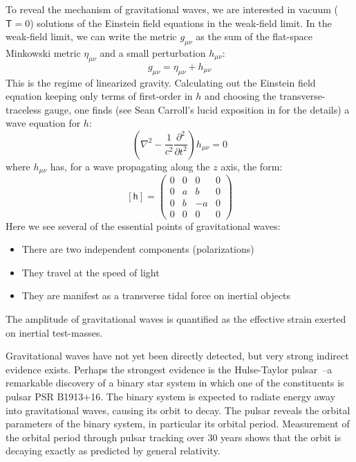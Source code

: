 To reveal the mechanism of gravitational waves, we are interested in
vacuum ($\mathsf{T}=0$) solutions of the Einstein field equations in
the weak-field limit.  In the weak-field limit, we can write the
metric $g_{\mu\nu}$ as the sum of the flat-space Minkowski metric
$\eta_{\mu\nu}$ and a small perturbation $h_{\mu\nu}$:
$$g_{\mu\nu} = \eta_{\mu\nu} + h_{\mu\nu}$$ This is the regime of
linearized gravity.  Calculating out the Einstein field equation
keeping only terms of first-order in $h$ and choosing the
transverse-traceless gauge, one finds (see Sean Carroll's lucid
exposition in \cite{Carroll1997Lecture} for the details) a wave
equation for $h$:
$$\left(\nabla^2 - \frac{1}{c^2}\frac{\partial^2}{\partial t^2}\right)h_{\mu\nu} = 0$$
where $h_{\mu\nu}$ has, for a wave propagating along the $z$ axis, the form:
$$ [\mathsf{h}] = \left(
\begin{array}{cccc}
0 & 0 &  0 & 0 \\
0 & a &  b & 0 \\
0 & b & -a & 0 \\ 
0 & 0 &  0 & 0 
\end{array}
 \right)$$
Here we see several of the essential points of gravitational waves:
\begin{itemize}
\item There are two independent components (polarizations)
\item They travel at the speed of light 
\item They are manifest as a transverse tidal force on inertial objects
\end{itemize}

The amplitude of gravitational waves is quantified as the effective
strain exerted on inertial test-masses.


Gravitational waves have not yet been directly detected, but very
strong indirect evidence exists.  Perhaps the strongest evidence is
the Hulse-Taylor
pulsar~\cite{Hulse1975Discovery,Weisberg2005Relativistic}--a
remarkable discovery of a binary star system in which one of the
constituents is pulsar PSR B1913+16. The binary system is expected to
radiate energy away into gravitational waves, causing its orbit to
decay.  The pulsar reveals the orbital parameters of the binary
system, in particular its orbital period. Measurement of the orbital
period through pulsar tracking over 30 years shows that the orbit is
decaying exactly as predicted by general relativity.

